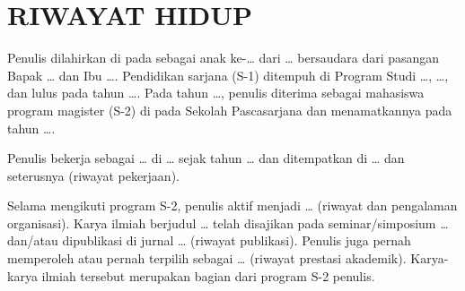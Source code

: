 %

\chapter*{RIWAYAT HIDUP}

Penulis dilahirkan di \TempatLahir{} pada \TanggalLahir{} sebagai anak
ke-\ldots{} dari \ldots{} bersaudara dari pasangan Bapak \ldots{} dan Ibu
\ldots. Pendidikan sarjana (S-1) ditempuh di Program Studi \ldots,
\Fakultas{} \ldots, dan lulus pada tahun \ldots. Pada tahun \ldots, penulis
diterima sebagai mahasiswa program magister (S-2) di \ProgramStudi{} pada
Sekolah Pascasarjana \Universitas{} dan menamatkannya pada tahun \ldots.

Penulis bekerja sebagai \ldots{} di \ldots{} sejak tahun \ldots{} dan
ditempatkan di \ldots{} dan seterusnya (riwayat pekerjaan).

Selama mengikuti program S-2, penulis aktif menjadi \ldots{} (riwayat dan
pengalaman organisasi). Karya ilmiah berjudul \ldots{} telah disajikan pada
seminar/simposium \ldots{} dan/atau dipublikasi di jurnal \ldots{} (riwayat
publikasi). Penulis juga pernah memperoleh atau pernah terpilih sebagai
\ldots{} (riwayat prestasi akademik). Karya-karya ilmiah tersebut merupakan
bagian dari program S-2 penulis.
